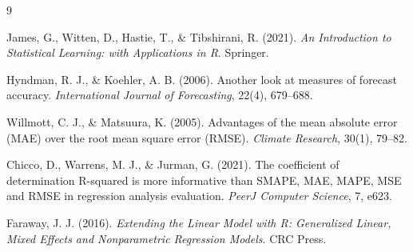 \documentclass{article}
\begin{document}
   \newpage
    \begin{thebibliography}{9}

James, G., Witten, D., Hastie, T., \& Tibshirani, R. (2021).  
\textit{An Introduction to Statistical Learning: with Applications in R}.  
Springer.

Hyndman, R. J., \& Koehler, A. B. (2006).  
Another look at measures of forecast accuracy.  
\textit{International Journal of Forecasting}, 22(4), 679–688.

Willmott, C. J., \& Matsuura, K. (2005).  
Advantages of the mean absolute error (MAE) over the root mean square error (RMSE).  
\textit{Climate Research}, 30(1), 79–82.

Chicco, D., Warrens, M. J., \& Jurman, G. (2021).  
The coefficient of determination R-squared is more informative than SMAPE, MAE, MAPE, MSE and RMSE in regression analysis evaluation.  
\textit{PeerJ Computer Science}, 7, e623.

Faraway, J. J. (2016).  
\textit{Extending the Linear Model with R: Generalized Linear, Mixed Effects and Nonparametric Regression Models}.  
CRC Press.

\end{thebibliography}
    
\end{document}
